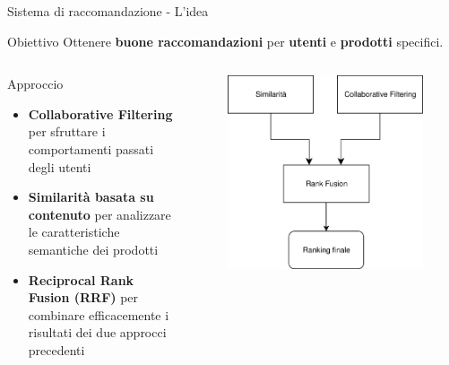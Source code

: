 \documentclass{beamer}
\begin{document}
	\begin{frame}{Sistema di raccomandazione - L'idea}
        \begin{alertblock}{Obiettivo}
			Ottenere \textbf{buone raccomandazioni} per \textbf{utenti} e \textbf{prodotti} specifici.
		\end{alertblock}

		\begin{columns}
			\begin{column}{0.6\textwidth}
				\begin{exampleblock}{Approccio}
					\begin{itemize}
						\item \textbf{Collaborative Filtering} per sfruttare i comportamenti passati degli utenti
						\item \textbf{Similarità basata su contenuto} per analizzare le caratteristiche semantiche dei prodotti
						\item \textbf{Reciprocal Rank Fusion (RRF)} per combinare efficacemente i risultati dei due approcci precedenti
					\end{itemize}
				\end{exampleblock}
			\end{column}
			\begin{column}{0.4\textwidth}
				\begin{figure}
					\centering
					\includegraphics[width=\textwidth]{Diagramma pipeline sistema di raccomandazione.png}
				\end{figure}
			\end{column}
		\end{columns}
	\end{frame}
\end{document}
